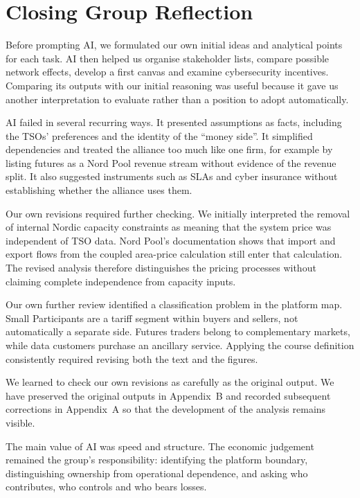 \section*{Closing Group Reflection}

Before prompting AI, we formulated our own initial ideas
and analytical points for each task.
AI then helped us organise stakeholder lists,
compare possible network effects,
develop a first canvas and examine cybersecurity incentives.
Comparing its outputs with our initial reasoning was useful
because it gave us another interpretation to evaluate
rather than a position to adopt automatically.

AI failed in several recurring ways.
It presented assumptions as facts,
including the TSOs' preferences and the identity
of the ``money side''.
It simplified dependencies and treated the alliance
too much like one firm, for example by listing futures
as a Nord Pool revenue stream without evidence
of the revenue split.
It also suggested instruments such as SLAs
and cyber insurance without establishing
whether the alliance uses them.

Our own revisions required further checking.
We initially interpreted the removal of internal Nordic
capacity constraints as meaning that the system price
was independent of TSO data.
Nord Pool's documentation shows that import and export
flows from the coupled area-price calculation
still enter that calculation.
The revised analysis therefore distinguishes
the pricing processes without claiming complete
independence from capacity inputs.

Our own further review identified a classification problem
in the platform map.
Small Participants are a tariff segment
within buyers and sellers, not automatically a separate side.
Futures traders belong to complementary markets,
while data customers purchase an ancillary service.
Applying the course definition consistently required
revising both the text and the figures.

We learned to check our own revisions as carefully as the original output.
We have preserved the original outputs in Appendix~B
and recorded subsequent corrections in Appendix~A
so that the development of the analysis remains visible.

The main value of AI was speed and structure.
The economic judgement remained the group's responsibility:
identifying the platform boundary,
distinguishing ownership from operational dependence,
and asking who contributes, who controls and who bears losses.